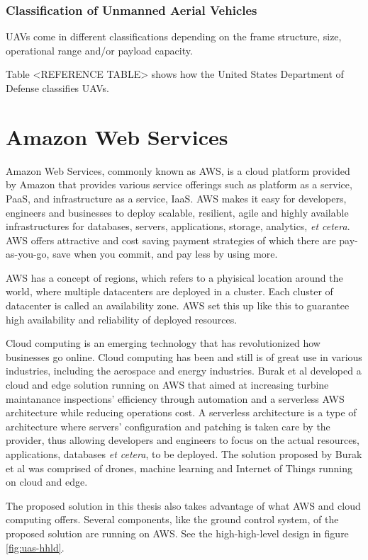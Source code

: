 \subsubsection{Classification of Unmanned Aerial Vehicles}
UAVs come in different classifications depending on the frame structure, size, operational range and/or payload capacity.

Table <REFERENCE TABLE> shows how the United States Department of Defense classifies UAVs.


\section{Amazon Web Services}
Amazon Web Services, commonly known as AWS, is a cloud platform provided by Amazon that provides various service offerings such as platform as a service, PaaS, and infrastructure as a service, IaaS\cite{awswhatisaws2022}. AWS makes it easy for developers, engineers and businesses to deploy scalable, resilient, agile and highly available infrastructures for databases, servers, applications, storage, analytics, \textit{et cetera}. AWS offers attractive and cost saving payment strategies of which there are pay-as-you-go, save when you commit, and pay less by using more\cite{awspricing2022}.

AWS has a concept of regions, which refers to a phyisical location around the world, where multiple datacenters are deployed in a cluster. Each cluster of datacenter is called an availability zone\cite{awsregionsandazs}. AWS set this up like this to guarantee high availability and reliability of deployed resources.

Cloud computing is an emerging technology that has revolutionized how businesses go online. Cloud computing has been and still is of great use in various industries, including the aerospace and energy industries. Burak et al developed a cloud and edge solution running on AWS that aimed at increasing turbine maintanance inspections' efficiency through automation and a serverless AWS architecture while reducing operations cost\cite{burakawswindfarm2021}. A serverless architecture is a type of architecture where servers' configuration and patching is taken care by the provider, thus allowing developers and engineers to focus on the actual resources, applications, databases \textit{et cetera}, to be deployed. The solution proposed by Burak et al was comprised of drones, machine learning and Internet of Things running on cloud and edge.

The proposed solution in this thesis also takes advantage of what AWS and cloud computing offers. Several components, like the ground control system, of the proposed solution are running on AWS. See the high-high-level design in figure \ref{fig:uas-hhld}.


